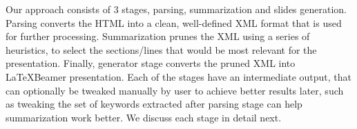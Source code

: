 Our approach consists of 3 stages, parsing, summarization
and slides generation. Parsing converts the HTML into a clean,
well-defined XML format that is used for further processing.
Summarization prunes the XML using a series of heuristics, 
to select the sections/lines that would be most relevant for
the presentation. Finally, generator stage converts the
pruned XML into \LaTeX Beamer presentation. Each of the 
stages have an intermediate output, that can optionally be
tweaked manually by user to achieve better results later, such
as tweaking the set of keywords extracted after parsing stage
can help summarization work better. We discuss each stage in detail next.